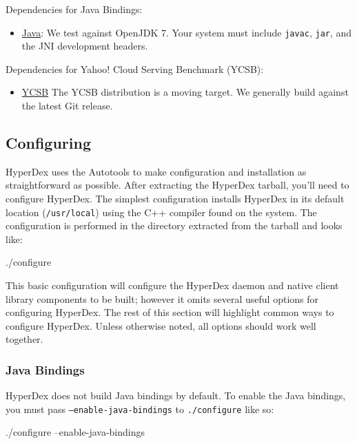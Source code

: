 Dependencies for Java Bindings:

\begin{itemize}
\item \href{http://openjdk.java.net/}{Java}: We test against OpenJDK 7.  Your
    system must include \texttt{javac}, \texttt{jar}, and the JNI development
    headers.
\end{itemize}

Dependencies for Yahoo! Cloud Serving Benchmark (YCSB):

\begin{itemize}
\item \href{https://github.com/brianfrankcooper/YCSB/wiki}{YCSB} The YCSB
    distribution is a moving target.  We generally build against the latest Git
    release.
\end{itemize}

\subsection{Configuring}

HyperDex uses the Autotools to make configuration and installation as
straightforward as possible.  After extracting the HyperDex tarball, you'll need
to configure HyperDex.  The simplest configuration installs HyperDex in its
default location (\texttt{/usr/local}) using the C++ compiler found on the
system.  The configuration is performed in the directory extracted from the
tarball and looks like:

\begin{consolecode}
./configure
\end{consolecode}

This basic configuration will configure the HyperDex daemon and native client
library components to be built; however it omits several useful options for
configuring HyperDex.  The rest of this section will highlight common ways to
configure HyperDex.  Unless otherwise noted, all options should work well
together.

\subsubsection{Java Bindings}

HyperDex does not build Java bindings by default.  To enable the Java bindings,
you must pass \texttt{--enable-java-bindings} to \texttt{./configure} like so:

\begin{consolecode}
./configure --enable-java-bindings
\end{consolecode}

